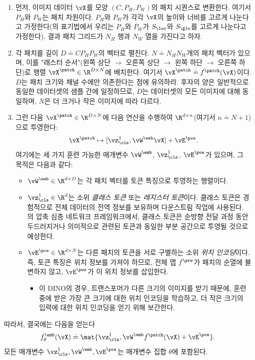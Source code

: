 \documentclass[../../book-main_ko.tex]{subfiles}
\begin{document}
\begin{enumerate}
    \item 먼저, 이미지 데이터 \(\vX\)를 모양 \((C, P_{H}, P_{W})\)의 패치 시퀀스로 변환한다. 여기서 \(P_{H}\)와 \(P_{W}\)는 패치 차원이다. \(P_{H}\)와 \(P_{W}\)가 각각 \(\vX\)의 높이와 너비를 고르게 나눈다고 가정한다(의 표기법에서 우리는 \(P_{H}\)와 \(P_{W}\)가 \(S_{\loc}\)와 \(S_{\glo}\)를 고르게 나눈다고 가정한다). 결과 패치 그리드가 \(N_{H}\) 행과 \(N_{W}\) 열을 가진다고 하자.
    \item 각 패치를 길이 \(D \doteq CP_{H}P_{W}\)의 벡터로 펼친다. \(N \doteq N_{H}N_{W}\)개의 패치 벡터가 있으며, 이를 "래스터 순서"(왼쪽 상단 \(\to\) 오른쪽 상단 \(\to\) 왼쪽 하단 \(\to\) 오른쪽 하단)로 행렬 \(\vX^{\patch} \in \R^{D \times N}\)에 배치한다. 여기서 \(\vX^{\patch} \doteq f^{\patch}(\vX)\)이다. \(D\)는 패치 크기와 채널 수에만 의존한다는 점에 유의하라. 후자의 양은 일반적으로 동일한 데이터셋의 샘플 간에 일정하므로, \(D\)는 데이터셋의 모든 이미지에 대해 동일하며, \(N\)은 더 크거나 작은 이미지에 따라 다르다.
    \item 그런 다음 \(\vX^{\patch} \in \R^{D \times N}\)에 다음 연산을 수행하여 \(\R^{d \times n}\)(여기서 \(n \doteq N + 1\))으로 투영한다:
    \begin{equation}
        \vX^{\patch} \mapsto [\vz_{\cls}^{1}, \vW^{\emb}\vX] + \vE^{\pos}.
    \end{equation}
    여기에는 세 가지 훈련 가능한 매개변수 \(\vW^{\emb}\), \(\vz_{\cls}^{1}\), \(\vE^{\pos}\)가 있으며, 그 목적은 다음과 같다:
    \begin{itemize}
        \item \(\vW^{\emb} \in \R^{d \times D}\)는 각 패치 벡터를 토큰 특징으로 투영하는 행렬이다.
        \item \(\vz_{\cls}^{1} \in \R^{d}\)는 소위 \textit{클래스 토큰} 또는 \textit{레지스터 토큰}이다. 클래스 토큰은 경험적으로 전체 데이터의 전역 정보를 보유하며 다운스트림 작업에 사용된다. 의 압축 심층 네트워크 프레임워크에서, 클래스 토큰은 순방향 전달 과정 동안 두드러지거나 의미적으로 관련된 토큰과 동일한 부분 공간으로 투영될 것으로 예상한다.
        \item \(\vE^{\pos} \in \R^{d \times N}\)는 다른 패치의 토큰을 서로 구별하는 소위 \textit{위치 인코딩}이다. 즉, 토큰 특징은 위치 정보를 가져야 하므로, 전체 맵 \(f^{\pre}\)가 패치의 순열에 불변하지 않고, \(\vE^{\pos}\)가 이 위치 정보를 삽입한다.
        \begin{itemize}
            \item 이 DINO의 경우, 트랜스포머가 다른 크기의 이미지를 받기 때문에, 훈련 중에 받은 가장 큰 크기에 대한 위치 인코딩을 학습하고, 더 작은 크기의 입력에 대한 위치 인코딩을 얻기 위해 보간한다.
        \end{itemize}
    \end{itemize}
\end{enumerate}
따라서, 결국에는 다음을 얻는다
\begin{equation}\label{eq:definition_of_embedding_module}
    f_{\theta}^{\emb}(\vX) \doteq \mat{\vz_{\cls}^{1}, \vW^{\emb}f^{\patch}(\vX) + \vE^{\pos}}.
\end{equation}
모든 매개변수 \(\vz_{\cls}^{1}, \vW^{\emb}, \vE^{\pos}\)는 매개변수 집합 \(\theta\)에 포함된다.
\end{document}
